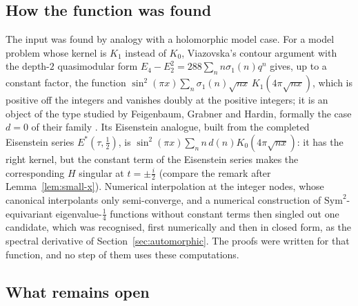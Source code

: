 \subsection{How the function was found}\label{ssec:history}

The input was found by analogy with a holomorphic model case. For a model problem whose kernel is $K_1$ instead of $K_0$,
Viazovska's contour argument with the depth-$2$ quasimodular form $E_4-E_2^2=288\sum_nn\sigma_1(n)q^n$ gives, up to a constant factor, the
function $\sin^2(\pi x)\sum_n\sigma_1(n)\sqrt{nx}\,K_1(4\pi\sqrt{nx})$, which is positive off the integers and vanishes doubly at the positive integers;
it is an object of the type studied by Feigenbaum, Grabner and Hardin, formally the case $d=0$ of their family \cite{FGH21}. Its Eisenstein
analogue, built from the completed Eisenstein series $E^*(\tau,\frac12)$, is $\sin^2(\pi x)\sum_nn\,d(n)K_0(4\pi\sqrt{nx})$: it has the right
kernel, but the constant term of the Eisenstein series makes the corresponding $H$ singular at $t=\pm\frac i2$ (compare the remark after
Lemma~\ref{lem:small-x}). Numerical interpolation at the integer nodes, whose canonical interpolants only semi-converge, and a numerical
construction of $\mathrm{Sym}^2$-equivariant eigenvalue-$\frac14$ functions without constant terms then singled out one candidate, which was
recognised, first numerically and then in closed form, as the spectral derivative of Section~\ref{sec:automorphic}. The proofs were
written for that function, and no step of them uses these computations.

\subsection{What remains open}


